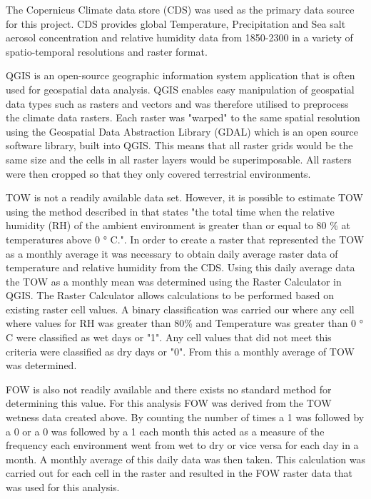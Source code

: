 \documentclass{article}
\begin{document}
The Copernicus Climate data store (CDS) was used as the primary data source for this project. CDS provides global Temperature, Precipitation and Sea salt aerosol concentration and relative humidity data from 1850-2300 in a variety of spatio-temporal resolutions and raster format\citep{ECMWF2016}.

QGIS is an open-source geographic information system application that is often used for geospatial data analysis. QGIS enables easy manipulation of geospatial data types such as rasters and vectors and was therefore utilised to preprocess the climate data rasters. Each raster was "warped" to the same spatial resolution using the Geospatial Data Abstraction Library (GDAL) which is an open source software library, built into QGIS. This means that all raster grids would be the same size and the cells in all raster layers would be superimposable. All rasters were then cropped so that they only covered terrestrial environments.  

TOW is not a readily available data set. However, it is possible to estimate TOW using the method described in \citet{Schindelholz2012} that states "the total time when the relative humidity (RH) of the ambient environment is greater than or equal to 80 \% at temperatures above 0 ° C.". In order to create a raster that represented the TOW as a monthly average it was necessary to obtain daily average raster data of temperature and relative humidity from the CDS.  Using this daily average data the TOW as a monthly mean was determined using the Raster Calculator in QGIS. The Raster Calculator allows calculations to be performed based on existing raster cell values. A binary classification was carried our where any cell where values for RH was greater than 80\%  and Temperature was greater than 0 ° C were classified as wet days or "1". Any cell values that did not meet this criteria were classified as dry days or "0". From this a monthly average of TOW was determined.

FOW is also not readily available and there exists no standard method for determining this value. For this analysis FOW was derived from the TOW wetness data created above. By counting the number of times a 1 was followed by a 0 or a 0 was followed by a 1 each month this acted as a measure of the frequency each environment went from wet to dry or vice versa for each day in a month. A monthly average of this daily data was then taken. This calculation was carried out for each cell in the raster and resulted in the FOW raster data that was used for this analysis.
\end{document}
